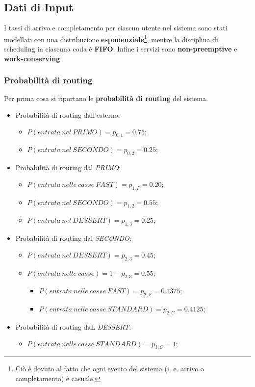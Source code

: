 \documentclass{article}
\begin{document}
\subsection{Dati di Input}\label{subsec:dati}
I tassi di arrivo e completamento per ciascun utente nel sistema sono stati modellati con una distribuzione \textbf{esponenziale}\footnote{Ciò è dovuto al fatto che ogni evento del sistema (i. e. arrivo o completamento) è casuale.}, mentre la disciplina di scheduling in ciascuna coda è \textbf{FIFO}. Infine i servizi sono \textbf{non-preemptive} e \textbf{work-conserving}.
\subsubsection{Probabilità di routing}

Per prima cosa si riportano le \textbf{probabilità di routing} del sistema.

\begin{itemize}
    \item Probabilità di routing dall'esterno:
    \begin{itemize}
        \item $P(entrata\ nel\ PRIMO) = p_{0,1} = 0.75$;
        \item $P(entrata\ nel\ SECONDO) = p_{0,2} = 0.25$;
    \end{itemize}
    
    \item Probabilità di routing dal \textit{PRIMO}:
    \begin{itemize}
        \item $P(entrata\ nelle\ casse\ FAST) = p_{1,F} = 0.20$;
        \item $P(entrata\ nel\ SECONDO) = p_{1,2} = 0.55$;
        \item $P(entrata\ nel\ DESSERT) = p_{1,3} = 0.25$;
    \end{itemize}
    \item Probabilità di routing dal \textit{SECONDO}:
    \begin{itemize}
        \item $P(entrata\ nel\ DESSERT) = p_{2,3} = 0.45$;
        \item $P(entrata\ nelle\ casse) = 1-p_{2,3} = 0.55$;
        \begin{itemize}
            \item $P(entrata\ nelle\ casse\ FAST) = p_{2,F} = 0.1375$;
            \item $P(entrata\ nelle\ casse\ STANDARD) = p_{2,C} = 0.4125$;
        \end{itemize}
    \end{itemize}
    \item Probabilità di routing daL \textit{DESSERT}:
    \begin{itemize}
        \item $P(entrata\ nelle\ casse\ STANDARD) = p_{3,C} = 1$;
    \end{itemize}
\end{itemize}
\end{document}
